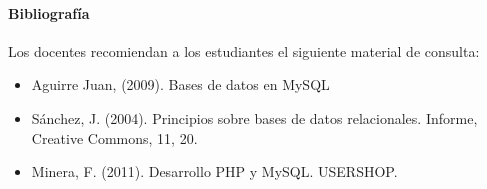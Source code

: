 \paragraph{Bibliografía} Los docentes recomiendan a los estudiantes el siguiente material de consulta:

\begin{itemize}
    \item Aguirre Juan, (2009). Bases de datos en MySQL 
    \item Sánchez, J. (2004). Principios sobre bases de datos relacionales. Informe, Creative Commons, 11, 20.
    \item Minera, F. (2011). Desarrollo PHP y MySQL. USERSHOP.
\end{itemize}
